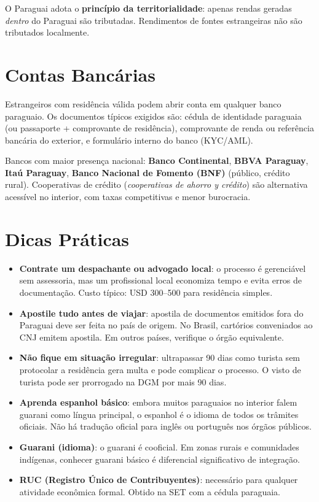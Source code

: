 O Paraguai adota o \textbf{princípio da territorialidade}: apenas rendas geradas \textit{dentro} do Paraguai são tributadas. Rendimentos de fontes estrangeiras não são tributados localmente.

\section*{Contas Bancárias}

Estrangeiros com residência válida podem abrir conta em qualquer banco paraguaio. Os documentos típicos exigidos são: cédula de identidade paraguaia (ou passaporte + comprovante de residência), comprovante de renda ou referência bancária do exterior, e formulário interno do banco (KYC/AML).

Bancos com maior presença nacional: \textbf{Banco Continental}, \textbf{BBVA Paraguay}, \textbf{Itaú Paraguay}, \textbf{Banco Nacional de Fomento (BNF)} (público, crédito rural). Cooperativas de crédito (\textit{cooperativas de ahorro y crédito}) são alternativa acessível no interior, com taxas competitivas e menor burocracia.

\section*{Dicas Práticas}

\begin{itemize}
\item \textbf{Contrate um despachante ou advogado local}: o processo é gerenciável sem assessoria, mas um profissional local economiza tempo e evita erros de documentação. Custo típico: USD 300--500 para residência simples.
\item \textbf{Apostile tudo antes de viajar}: apostila de documentos emitidos fora do Paraguai deve ser feita no país de origem. No Brasil, cartórios conveniados ao CNJ emitem apostila. Em outros países, verifique o órgão equivalente.
\item \textbf{Não fique em situação irregular}: ultrapassar 90 dias como turista sem protocolar a residência gera multa e pode complicar o processo. O visto de turista pode ser prorrogado na DGM por mais 90 dias.
\item \textbf{Aprenda espanhol básico}: embora muitos paraguaios no interior falem guarani como língua principal, o espanhol é o idioma de todos os trâmites oficiais. Não há tradução oficial para inglês ou português nos órgãos públicos.
\item \textbf{Guarani (idioma)}: o guarani é cooficial. Em zonas rurais e comunidades indígenas, conhecer guarani básico é diferencial significativo de integração.
\item \textbf{RUC (Registro Único de Contribuyentes)}: necessário para qualquer atividade econômica formal. Obtido na SET com a cédula paraguaia.
\end{itemize}

\clearpage
